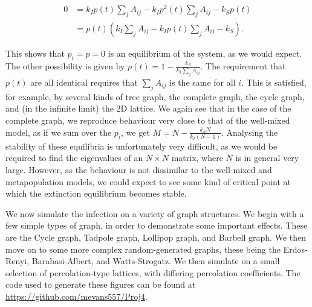 \documentclass[12pt,a4paper,openany,twoside]{book}
\begin{document}
\begin{equation}
\begin{aligned}
	0 &= k_I p(t) \sum_j A_{ij} - k_I p^2(t) \sum_j A_{ij} - k_S p(t) \\
	&= p(t) \left( k_I \sum_j A_{ij} - k_I p(t) \sum_j A_{ij} - k_S \right).
\end{aligned}
\end{equation}

This shows that $p_i = p = 0$ is an equilibrium of the system, as we would expect. The other possibility is given by $p(t) = 1 - \frac {k_S} {k_I \sum_j A_{ij}}$. The requirement that $p(t)$ are all identical requires that $\sum_j A_{ij}$ is the same for all $i$. This is satisfied, for example, by several kinds of tree graph, the complete graph, the cycle graph, and (in the infinite limit) the $2$D lattice. We again see that in the case of the complete graph, we reproduce behaviour very close to that of the well-mixed model, as if we sum over the $p_i$, we get $M = N - \frac {k_S N} {k_I (N-1)}$. Analysing the stability of these equilibria is unfortunately very difficult, as we would be required to find the eigenvalues of an $N \times N$ matrix, where $N$ is in general very large. However, as the behaviour is not dissimilar to the well-mixed and metapopulation models, we could expect to see some kind of critical point at which the extinction equilibrium becomes stable.

We now simulate the infection on a variety of graph structures. We begin with a few simple types of graph, in order to demonstrate some important effects. These are the Cycle graph, Tadpole graph, Lollipop graph, and Barbell graph. We then move on to some more complex random-generated graphs, these being the Erdos-Renyi, Barabasi-Albert, and Watts-Strogatz. We then simulate on a small selection of percolation-type lattices, with differing percolation coefficients. The code used to generate these figures can be found at \url{https://github.com/mevans557/Proj4}.
\end{document}
